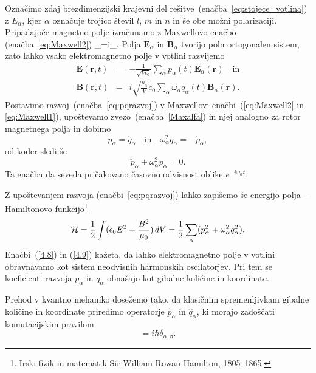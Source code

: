 Označimo zdaj brezdimenzijski krajevni del rešitve~(enačba~\ref{eq:stojece_votlina}) z 
$E_{\alpha}$, kjer $\alpha$
označuje trojico števil $l$, $m$ in $n$ in še obe možni polarizaciji. 
Pripadajoče magnetno polje izračunamo z Maxwellovo enačbo (enačba~\ref{eq:Maxwell2}) 
\beq
\nabla\times{}_{\alpha}=i\omega{}_{\alpha}.
\label{Maxalfa}
\eeq
Polja $\mathbf{E}_{\alpha}$ in $\mathbf{B}_{\alpha}$ tvorijo poln ortogonalen
sistem, zato lahko vsako elektromagnetno polje v votlini razvijemo
\begin{eqnarray}
\mathbf{E}(\mathbf{r},t) & = & -\frac{1}{\sqrt{V\epsilon_{0}}}
\sum_{\alpha}p_{\alpha}(t)\mathbf{E}_{\alpha}(\mathbf{r}) \quad \mathrm{in}\nonumber \\
\mathbf{B}(\mathbf{r},t) & = & i\sqrt{\frac{\mu_{0}}{V}}c_0\sum_{\alpha}
\omega_{\alpha}q_{\alpha}(t)\mathbf{B}_{\alpha}(\mathbf{r}).
\label{eq:pqrazvoj}
\end{eqnarray}
Postavimo razvoj~(enačba~\ref{eq:pqrazvoj}) v Maxwellovi enačbi~(\ref{eq:Maxwell2}
in \ref{eq:Maxwell1}), upoštevamo zvezo~(enačba~\ref{Maxalfa}) in njej analogno za rotor magnetnega polja
in dobimo 
\begin{equation}
p_{\alpha}=\dot{q}_{\alpha} \quad \mathrm{in} \quad 
\omega_{\alpha}^{2}q_{\alpha}=-\dot{p}_{\alpha},
\label{4.7}
\end{equation}
od koder sledi še 
\begin{equation}
\ddot{p}_{\alpha}+\omega_{\alpha}^{2}p_{\alpha}=0.
\label{4.8}
\end{equation}
Ta enačba da seveda pričakovano časovno odvisnost oblike $e^{-i \omega_\alpha t}$.

Z upoštevanjem razvoja (enačbi~\ref{eq:pqrazvoj}) lahko zapišemo še energijo 
polja -- Hamiltonovo 
funkcijo\footnote{Irski fizik in matematik Sir William Rowan Hamilton, 1805--1865.}
\begin{equation}
{\cal H}=\frac{1}{2}\int(\epsilon_{0}E^{2}+\frac{B^{2}}{\mu_0})\, 
dV=\frac{1}{2}\sum_{\alpha}(p_{\alpha}^{2}+\omega_{\alpha}^{2}q_{\alpha}^{2}).
\label{4.9}
\end{equation}
Enačbi~(\ref{4.8}) in (\ref{4.9}) kažeta, da lahko elektromagnetno polje v votlini
obravnavamo kot sistem neodvisnih harmonskih oscilatorjev. 
Pri tem se koeficienti razvoja $p_{\alpha}$ in $q_{\alpha}$ obnašajo kot
gibalne količine in koordinate. 

Prehod v kvantno mehaniko dosežemo tako, da klasičnim spremenljivkam gibalne količine
in koordinate priredimo operatorje $\hat{p}_{\alpha}$ in $\hat{q}_{\alpha}$,
ki morajo zadoščati komutacijskim pravilom 
\begin{equation}
[\hat{q}_{\alpha},\hat{p}_{\beta}]=i\hbar \delta_{\alpha, \beta}.
\label{4.10}
\end{equation}


